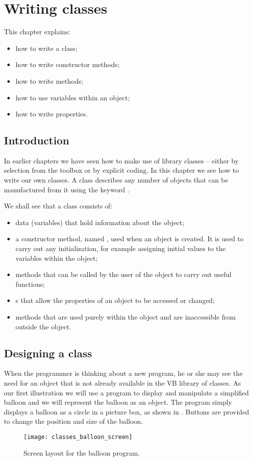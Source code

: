 \chapter{Writing classes}
  \label{ch:classes}

	This chapter explains:
	\begin{itemize}
  	\item how to write a class;
    \item how to write constructor methods;
    \item how to write  methods;
    \item how to use variables within an object;
    \item how to write properties.
	\end{itemize}

  \section{Introduction}
		In earlier chapters we have seen how to make use of library classes – either by selection from the toolbox or by explicit coding. In this chapter we see how to write our own classes. A class describes any number of objects that can be manufactured from it using the keyword .
		
		We shall see that a class consists of:
		\begin{itemize}
      \item {} data (variables) that hold information about the object;
      \item a constructor method, named , used when an object is created. It is used to carry out any initialization, for example assigning initial values to the variables within the object;
      \item {} methods that can be called by the user of the object to carry out useful functions;
			\item {}s that allow the properties of an object to be accessed or changed;
      \item {} methods that are used purely within the object and are inaccessible from outside the object.
		\end{itemize}
	

	\section{Designing a class}
	When the programmer is thinking about a new program, he or she may see the need for an object that is not already available in the VB library of classes. As our first illustration we will use a program to display and manipulate a simplified balloon and we will represent the balloon as an object. The program simply displays a balloon as a circle in a picture box, as shown in . Buttons are provided to change the position and size of the balloon.
				\begin{figure}[bth]
					\centering
					\texttt{[image: classes\_balloon\_screen]}
					\caption{Screen layout for the balloon program.}
					\label{fig:classes_balloon_screen}
				\end{figure}

